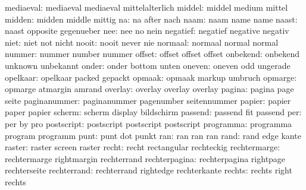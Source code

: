           mediaeval:  mediaeval            mediaeval           mittelalterlich
             middel:  middel               medium              mittel
             midden:  midden               middle              mittig
                 na:  na                   after               nach
               naam:  naam                 name                name
              naast:  naast                opposite            gegenueber
                nee:  nee                  no                  nein
           negatief:  negatief             negative            negativ
               niet:  niet                 not                 nicht
              nooit:  nooit                never               nie
            normaal:  normaal              normal              normal
             nummer:  nummer               number              nummer
             offset:  offset               offset              offset
           onbekend:  onbekend             unknown             unbekannt
              onder:  onder                bottom              unten
             oneven:  oneven               odd                 ungerade
           opelkaar:  opelkaar             packed              gepackt
             opmaak:  opmaak               markup              umbruch
            opmarge:  opmarge              atmargin            amrand
            overlay:  overlay              overlay             overlay
             pagina:  pagina               page                seite
       paginanummer:  paginanummer         pagenumber          seitennummer
             papier:  papier               paper               papier
             scherm:  scherm               display             bildschirm
            passend:  passend              fit                 passend
                per:  per                  by                  pro
         postscript:  postscript           postscript          postscript
          programma:  programma            program             programm
               punt:  punt                 dot                 punkt
                ran:  ran                  ran                 ran
               rand:  rand                 edge                kante
             raster:  raster               screen              raster
              recht:  recht                rectangular         rechteckig    
       rechtermarge:  rechtermarge         rightmargin         rechterrand
      rechterpagina:  rechterpagina        rightpage           rechterseite
        rechterrand:  rechterrand          rightedge           rechterkante
             rechts:  rechts               right               rechts
